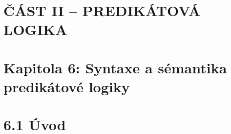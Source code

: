 \documentclass{beamer}
\begin{document}
        
    




\section{ČÁST II -- PREDIKÁTOVÁ LOGIKA}


\section{\sc Kapitola 6: Syntaxe a sémantika predikátové logiky}


\section{6.1 Úvod}
\end{document}
